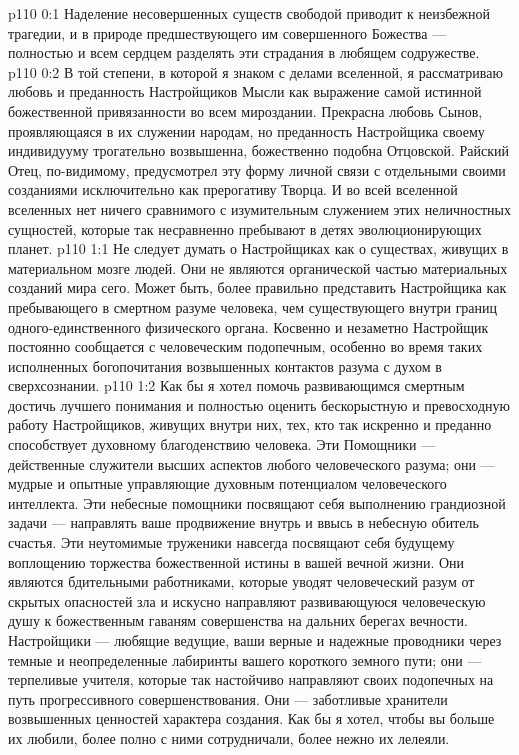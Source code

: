 \author{Одиночный Вестник}
\vs p110 0:1 Наделение несовершенных существ свободой приводит к неизбежной трагедии, и в природе предшествующего им совершенного Божества --- полностью и всем сердцем разделять эти страдания в любящем содружестве.
\vs p110 0:2 В той степени, в которой я знаком с делами вселенной, я рассматриваю любовь и преданность Настройщиков Мысли как выражение самой истинной божественной привязанности во всем мироздании. Прекрасна любовь Сынов, проявляющаяся в их служении народам, но преданность Настройщика своему индивидууму трогательно возвышенна, божественно подобна Отцовской. Райский Отец, по\hyp{}видимому, предусмотрел эту форму личной связи с отдельными своими созданиями исключительно как прерогативу Творца. И во всей вселенной вселенных нет ничего сравнимого с изумительным служением этих неличностных сущностей, которые так несравненно пребывают в детях эволюционирующих планет.
\vs p110 1:1 Не следует думать о Настройщиках как о существах, живущих в материальном мозге людей. Они не являются органической частью материальных созданий мира сего. Может быть, более правильно представить Настройщика как пребывающего в смертном разуме человека, чем существующего внутри границ одного\hyp{}единственного физического органа. Косвенно и незаметно Настройщик постоянно сообщается с человеческим подопечным, особенно во время таких исполненных богопочитания возвышенных контактов разума с духом в сверхсознании.
\vs p110 1:2 Как бы я хотел помочь развивающимся смертным достичь лучшего понимания и полностью оценить бескорыстную и превосходную работу Настройщиков, живущих внутри них, тех, кто так искренно и преданно способствует духовному благоденствию человека. Эти Помощники --- действенные служители высших аспектов любого человеческого разума; они --- мудрые и опытные управляющие духовным потенциалом человеческого интеллекта. Эти небесные помощники посвящают себя выполнению грандиозной задачи --- направлять ваше продвижение внутрь и ввысь в небесную обитель счастья. Эти неутомимые труженики навсегда посвящают себя будущему воплощению торжества божественной истины в вашей вечной жизни. Они являются бдительными работниками, которые уводят человеческий разум от скрытых опасностей зла и искусно направляют развивающуюся человеческую душу к божественным гаваням совершенства на дальних берегах вечности. Настройщики --- любящие ведущие, ваши верные и надежные проводники через темные и неопределенные лабиринты вашего короткого земного пути; они --- терпеливые учителя, которые так настойчиво направляют своих подопечных на путь прогрессивного совершенствования. Они --- заботливые хранители возвышенных ценностей характера создания. Как бы я хотел, чтобы вы больше их любили, более полно с ними сотрудничали, более нежно их лелеяли.
